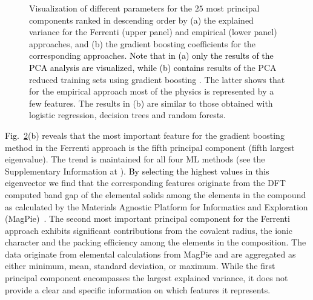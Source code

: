 \documentclass[superscriptaddress,unsortedaddress,
 amsmath,amssymb,
 aps,
]{revtex4-2}
\newcommand{\mrk}[1]{\textcolor{black}{#1}}
\begin{document}
\begin{figure}[t]
\begin{subfigure}[b]{0.45\textwidth}
        \label{fig:03-fi-d}
        \subcaption{}
    \end{subfigure}
    \caption{Visualization of different parameters for the $25$ most principal components ranked in descending order by (a) the explained variance for the Ferrenti (upper panel) and empirical (lower panel) approaches, and (b) the gradient boosting coefficients for the corresponding approaches. \mrk{Note that in (a) only the results of the PCA analysis are visualized, while (b) contains} results of the PCA reduced training sets using gradient boosting \cite{Hastie2009,xgboost2016}. The latter shows that for the empirical approach most of the physics is represented by a few features. The results in (b) are similar to those obtained with logistic regression, decision trees and random forests.  
    }
    \label{fig:PComponents}
\end{figure}

\mrk{Fig.}~\ref{fig:PComponents}(b) reveals that the most important feature for the gradient boosting method in the Ferrenti approach is the fifth principal component (fifth largest eigenvalue). The trend is maintained for all four ML methods (see the Supplementary Information at \cite{supplementary}). \mrk{By selecting the highest values in this eigenvector we} find that the corresponding features originate from the DFT computed band gap of the elemental solids among the elements in the compound as calculated by the Materials Agnostic Platform for Informatics and Exploration (MagPie)~\cite{magpie}. 
The second most important principal component for the Ferrenti approach exhibits significant contributions from the covalent radius, the ionic character and the packing efficiency among the elements in the composition. 
The data originate from elemental calculations from MagPie and are aggregated as either minimum, mean, standard deviation, or maximum. 
While the first principal component encompasses the largest explained variance, it does not provide a clear and specific information on which features it represents. 

\end{document}
